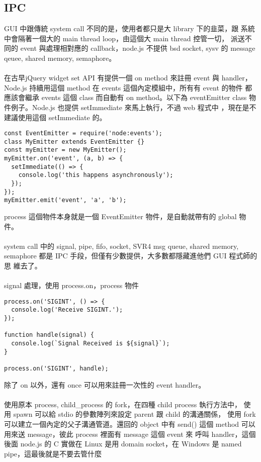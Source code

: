  \subsection{IPC}
  GUI 中跟傳統 system call 不同的是，使用者都只是大 library 下的韭菜，跟
  系統中會隔著一個大的 main thread loop，由這個大 main thread 控管一切，
  派送不同的 event 與處理相對應的 callback，node.js 不提供 bsd socket,
  sysv 的 message qeuee, shared memory, semaphore。
  \\\\
  在古早jQuery widget set API 有提供一個 on method 來註冊 event 與 handler，
  Node.js 持續用這個 method 在 events 這個內定模組中，所有有 event 的物件
  都應該會繼承 events 這個 class 而自動有 on method。以下為 eventEmitter
  class 物件例子。Node.js 也提供 setImmediate 來馬上執行，不過 web 程式中
  ，現在是不建議使用這個 setImmediate 的。
  \begin{verbatim}
const EventEmitter = require('node:events');
class MyEmitter extends EventEmitter {}
const myEmitter = new MyEmitter();
myEmitter.on('event', (a, b) => {
  setImmediate(() => {
    console.log('this happens asynchronously');
  });
});
myEmitter.emit('event', 'a', 'b');
  \end{verbatim}
  process 這個物件本身就是一個 EventEmitter 物件，是自動就帶有的 global 物件。
  \\\\
  system call 中的 signal, pipe, fifo, socket, SVR4 msg queue, shared memory,
  semaphore 都是 IPC 手段，但僅有少數提供，大多數都隱藏進他們 GUI 程式師的思
  維去了。
  \\\\
  signal 處理，使用 process.on，process 物件
  \begin{verbatim}
process.on('SIGINT', () => {
  console.log('Receive SIGINT.');
});
 
function handle(signal) {
  console.log(`Signal Received is ${signal}`);
}
 
process.on('SIGINT', handle);
  \end{verbatim}
  除了 on 以外，還有 once 可以用來註冊一次性的 event handler。
  \\\\
  使用原本 process, child\_process 的 fork，在四種 child process 執行方法中，
  使用 spawn 可以給 stdio 的參數陣列來設定 parent 跟 child 的溝通關係，
  使用 fork 可以建立一個內定的父子溝通管道。還回的 object 中有 send()
  這個 method 可以用來送 message，彼此 process 裡面有 message 這個 event 來
  呼叫 handler，這個後面 node.js 的 C 實做在 Linux
  是用 domain socket，在 Windows 是 named pipe，這最後就是不要去管什麼
